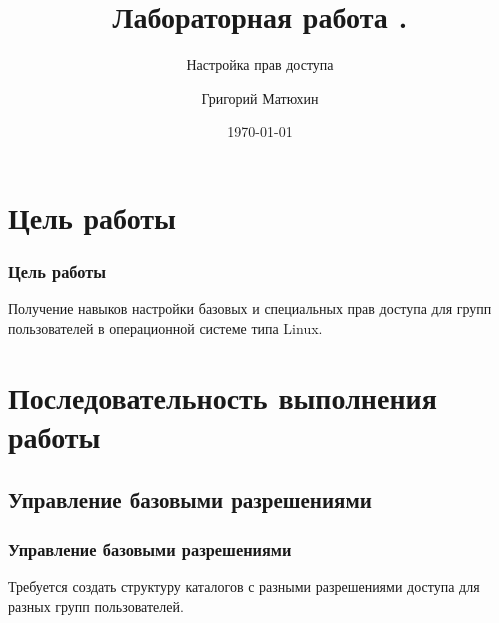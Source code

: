 \documentclass{beamer}
\author{Григорий Матюхин}
\date{\today}
\title{Лабораторная работа \textnumero3.}
\subtitle{Настройка прав доступа}
\begin{document}
\begin{frame}[plain]
	\titlepage
\end{frame}
\section{Цель работы}
\begin{frame}[plain]
	\frametitle{Цель работы}
	Получение навыков настройки базовых и специальных прав доступа для групп пользователей в операционной системе типа Linux.
\end{frame}

\section{Последовательность выполнения работы}

\subsection{Управление базовыми разрешениями}
\begin{frame}[plain]
	\frametitle{Управление базовыми разрешениями}
	Требуется создать структуру каталогов с разными разрешениями доступа для разных групп пользователей.
\end{frame}
\end{document}
